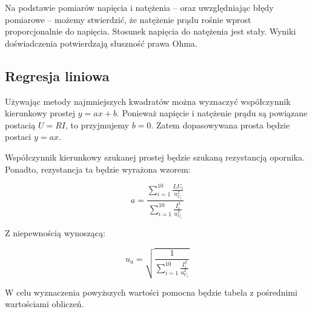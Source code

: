 \documentclass[a4paper]{article}
\begin{document}
Na podstawie pomiarów napięcia i natężenia -- oraz uwzględniając błędy pomiarowe -- możemy stwierdzić, że natężenie prądu rośnie wprost proporcjonalnie do napięcia.
Stosunek napięcia do natężenia jest stały.
Wyniki doświadczenia potwierdzają słuszność prawa Ohma.

\subsection{Regresja liniowa}

Używając metody najmniejszych kwadratów można wyznaczyć współczynnik kierunkowy prostej $y = ax + b$.
Ponieważ napięcie i natężenie prądu są powiązane postacią $U = RI$, to przyjmujemy $b = 0$.
Zatem dopasowywana prosta będzie postaci $y = ax$.

Współczynnik kierunkowy szukanej prostej będzie szukaną rezystancją opornika. Ponadto, rezystancja ta będzie wyrażona wzorem:

$$a = \frac{\sum_{i = 1}^{10}\frac{I_i U_i}{u_{U_i}^2}}{\sum_{i = 1}^{10}\frac{I_i^2}{u_{U_i}^2}}$$

Z niepewnością wynoszącą:

$$u_a = \sqrt{\frac{1}{\sum_{i = 1}^{10}\frac{I_i^2}{u_{U_i}^2}}}$$

W celu wyznaczenia powyższych wartości pomocna będzie tabela z pośrednimi wartościami obliczeń.
\end{document}
